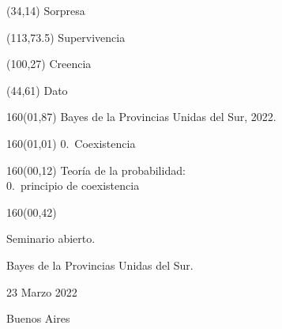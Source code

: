 \documentclass[shownotes,aspectratio=169]{beamer}
\begin{document}
\color{black!85}
\large

 

\begin{frame}
\begin{textblock}{80}(34,14)
 \huge \textcolor{black!50}{Sorpresa}
\end{textblock}

\begin{textblock}{47}(113,73.5)
\centering \LARGE  \textcolor{black!5}{Supervivencia}
\end{textblock}

\begin{textblock}{80}(100,27)
\LARGE  \textcolor{black!10}{Creencia}
\end{textblock}

\begin{textblock}{80}(44,61)
\LARGE  \textcolor{black!15}{Dato}
\end{textblock}

\begin{textblock}{160}(01,87)
\scriptsize \textcolor{black!5}{Bayes de la Provincias Unidas del Sur, 2022.}
\end{textblock}

\begin{textblock}{160}(01,01)
\normalsize \textcolor{black!60}{0.\ Coexistencia}
\end{textblock}

{}
\end{frame}

\begin{frame}
\begin{textblock}{160}(00,12)
\centering
\huge Teoría de la probabilidad: \\ 0.\ principio de coexistencia
\end{textblock}

\begin{textblock}{160}(00,42) \centering

Seminario abierto.

Bayes de la Provincias Unidas del Sur.


\vspace{1.5cm}

23 Marzo 2022

\vspace{.3cm}

Buenos Aires
\end{textblock}



\end{frame}
\end{document}
